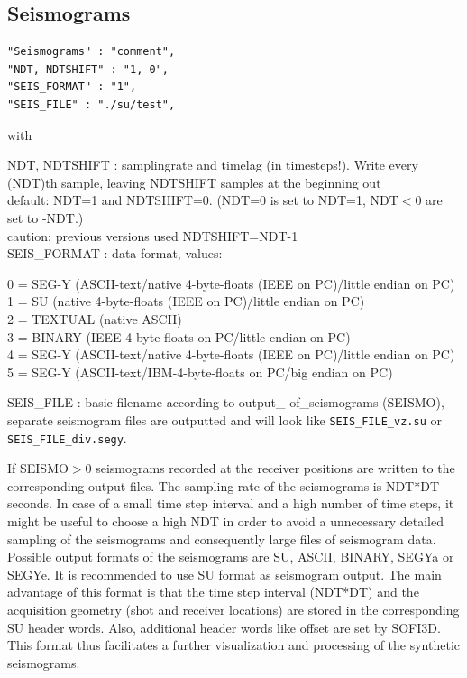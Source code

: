 \documentclass{hitec}
\begin{document}
\subsection{Seismograms}
\label{seismograms}
\begin{verbatim}
"Seismograms" : "comment",
"NDT, NDTSHIFT" : "1, 0",
"SEIS_FORMAT" : "1",
"SEIS_FILE" : "./su/test",
\end{verbatim}

with

NDT, NDTSHIFT : samplingrate and timelag (in timesteps!). Write every (NDT)th sample, leaving NDTSHIFT samples at the beginning out\\
default: NDT=1 and NDTSHIFT=0. (NDT=0 is set to NDT=1, NDT$<$0 are set to -NDT.)\\
caution: previous versions used NDTSHIFT=NDT-1\\
SEIS\_FORMAT : data-format, values:
\par
\begingroup
\leftskip=0.5cm
0 = SEG-Y (ASCII-text/native 4-byte-floats (IEEE on PC)/little endian on PC)\\
1 = SU (native 4-byte-floats (IEEE on PC)/little endian on PC)\\
2 = TEXTUAL (native ASCII)\\
3 = BINARY (IEEE-4-byte-floats on PC/little endian on PC)\\
4 = SEG-Y (ASCII-text/native 4-byte-floats (IEEE on PC)/little endian on PC)\\
5 = SEG-Y (ASCII-text/IBM-4-byte-floats on PC/big endian on PC) \\
\par
\endgroup
SEIS\_FILE : basic filename according to output\_ of\_seismograms (SEISMO), separate seismogram files are outputted and will look like  \lstinline{SEIS_FILE_vz.su} or  \lstinline{SEIS_FILE_div.segy}.

If SEISMO$>$0 seismograms recorded at the receiver positions are written to the corresponding output files. The sampling rate of the seismograms is NDT*DT seconds. In case of a small
time step interval and a high number of time steps, it might be useful to choose a high NDT in order to avoid a unnecessary detailed sampling of the seismograms and consequently large files of seismogram data. Possible output formats of the seismograms are SU, ASCII, BINARY, SEGYa or SEGYe. It is recommended to use SU format as seismogram output. The main advantage of this format is that the
time step interval (NDT*DT) and the acquisition geometry (shot and receiver locations) are stored in the corresponding SU header words. Also, additional header words like offset are set by SOFI3D. This format thus facilitates a further visualization and processing of the synthetic seismograms.
\end{document}
